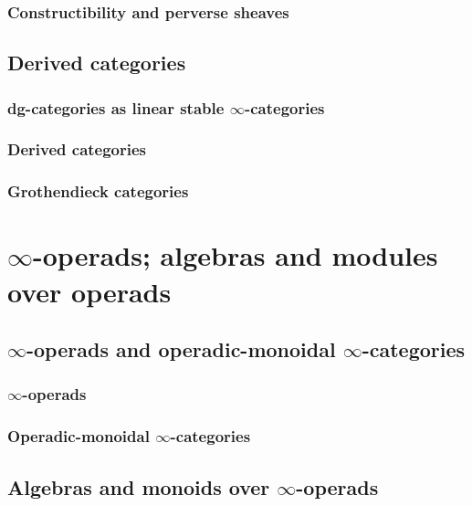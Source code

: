             \subsubsection{Constructibility and perverse sheaves}
            
        \subsection{Derived categories}
            \subsubsection{dg-categories as linear stable \texorpdfstring{$\infty$}{}-categories}
            
            \subsubsection{Derived categories}
            
            \subsubsection{Grothendieck categories}
    
    \section{\texorpdfstring{$\infty$}{}-operads; algebras and modules over operads} \label{section: algebras_and_modules_over_operads}
        \subsection{\texorpdfstring{$\infty$}{}-operads and operadic-monoidal \texorpdfstring{$\infty$}{}-categories} \label{subsection: operads}
            \subsubsection{\texorpdfstring{$\infty$}{}-operads}
            
            \subsubsection{Operadic-monoidal \texorpdfstring{$\infty$}{}-categories}
        
        \subsection{Algebras and monoids over \texorpdfstring{$\infty$}{}-operads}
        
